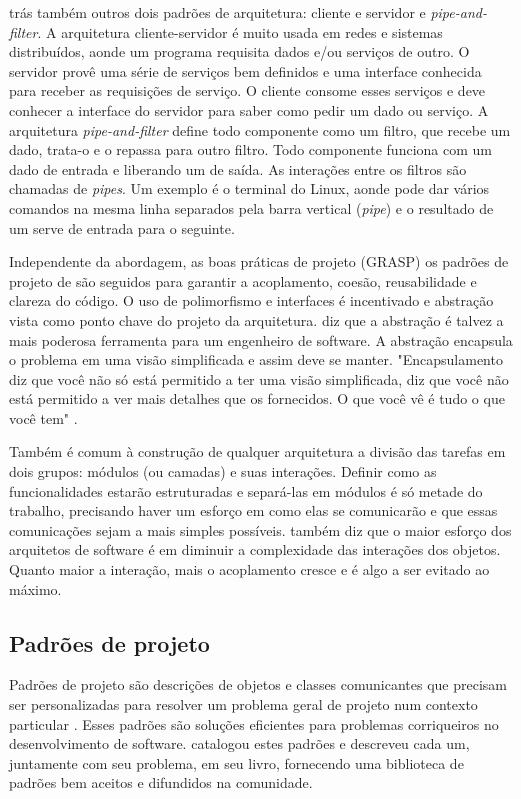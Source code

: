 \cite{Goodliffe2007} trás também outros dois padrões de arquitetura: cliente e servidor e \textit{pipe-and-filter}. A arquitetura cliente-servidor é muito usada em redes e sistemas distribuídos, aonde um programa requisita dados e/ou serviços de outro. O servidor provê uma série de serviços bem definidos e uma interface conhecida para receber as requisições de serviço. O cliente consome esses serviços e deve conhecer a interface do servidor para saber como pedir um dado ou serviço. A arquitetura \textit{pipe-and-filter} define todo componente como um filtro, que recebe um dado, trata-o e o repassa para outro filtro. Todo componente funciona com um dado de entrada e liberando um de saída. As interações entre os filtros são chamadas de \textit{pipes}. Um exemplo é o terminal do Linux, aonde pode dar vários comandos na mesma linha separados pela barra vertical (\textit{pipe}) e o resultado de um serve de entrada para o seguinte.

Independente da abordagem, as boas práticas de projeto (GRASP) os padrões de projeto de \cite{Gamma1995} são seguidos para garantir a acoplamento, coesão, reusabilidade e clareza do código. O uso de polimorfismo e interfaces é incentivado e abstração vista como ponto chave do projeto da arquitetura. \cite{Szyperski2002} diz que a abstração é talvez a mais poderosa ferramenta para um engenheiro de software. A abstração encapsula o problema em uma visão simplificada e assim deve se manter. "Encapsulamento diz que você não só está permitido a ter uma visão simplificada, diz que você não está permitido a ver mais detalhes que os fornecidos. O que você vê é tudo o que você tem" \cite{McConnel2004}.

Também é comum à construção de qualquer arquitetura a divisão das tarefas em dois grupos: módulos (ou camadas) e suas interações. Definir como as funcionalidades estarão estruturadas e separá-las em módulos é só metade do trabalho, precisando haver um esforço em como elas se comunicarão e que essas comunicações sejam a mais simples possíveis. \cite{Szyperski2002} também diz que o maior esforço dos arquitetos de software é em diminuir a complexidade das interações dos objetos. Quanto maior a interação, mais o acoplamento cresce e é algo a ser evitado ao máximo.

\subsection{Padrões de projeto}

Padrões de projeto são descrições de objetos e classes comunicantes que precisam ser personalizadas para resolver um problema geral de projeto num contexto particular \cite{Gamma1995}. Esses padrões são soluções eficientes para problemas corriqueiros no desenvolvimento de software. \cite{Gamma1995} catalogou estes padrões e descreveu cada um, juntamente com seu problema, em seu livro, fornecendo uma biblioteca de padrões bem aceitos e difundidos na comunidade.

